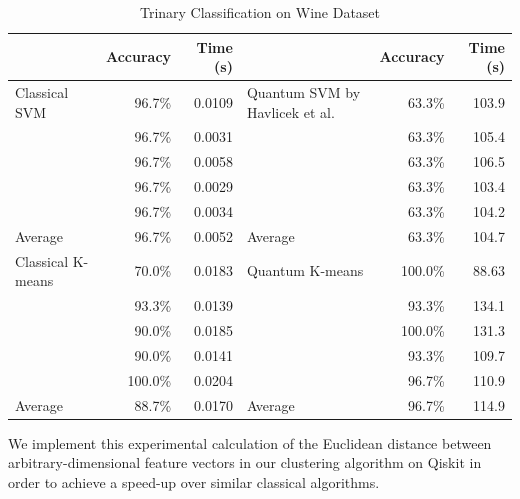 \documentclass[twocolumn, english]{revtex4-2}
\numberwithin{equation}{section}
\begin{document}
\begin{table}
\begin{tabular}{l|r|r|l|r|r}
&Accuracy&Time (s)&&Accuracy&Time (s)\\
\hline
Classical SVM&96.7\%&0.0109&Quantum SVM by Havlicek et al.&63.3\%&103.9\\
\cline{2-3}\cline{5-6}
&96.7\%&0.0031&&63.3\%&105.4\\
\cline{2-3}\cline{5-6}
&96.7\%&0.0058&&63.3\%&106.5\\
\cline{2-3}\cline{5-6}
&96.7\%&0.0029&&63.3\%&103.4\\
\cline{2-3}\cline{5-6}
&96.7\%&0.0034&&63.3\%&104.2\\
\hline\hline
Average&96.7\%&0.0052&Average&63.3\%&104.7\\
\hline\hline
Classical K-means&70.0\%&0.0183&Quantum K-means&100.0\%&88.63\\
\cline{2-3}\cline{5-6}
&93.3\%&0.0139&&93.3\%&134.1\\
\cline{2-3}\cline{5-6}
&90.0\%&0.0185&&100.0\%&131.3\\
\cline{2-3}\cline{5-6}
&90.0\%&0.0141&&93.3\%&109.7\\
\cline{2-3}\cline{5-6}
&100.0\%&0.0204&&96.7\%&110.9\\
\hline\hline
Average&88.7\%&0.0170&Average&96.7\%&114.9\\
\hline\hline
\end{tabular}
\caption{Trinary Classification on Wine Dataset}
\end{table}

We implement this experimental calculation of the Euclidean distance between arbitrary-dimensional feature vectors in our clustering algorithm on Qiskit in order to achieve a speed-up over similar classical algorithms.
\end{document}
